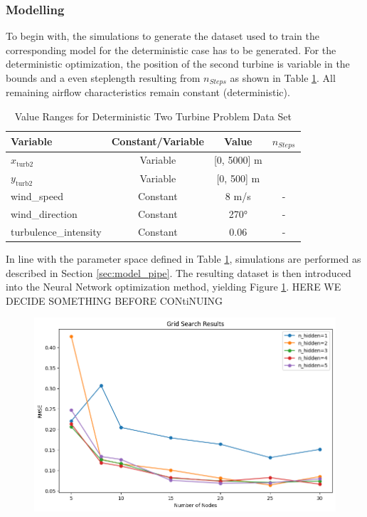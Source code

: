 \subsubsection{Modelling}

To begin with, the simulations to generate the dataset used to train the corresponding model for the deterministic case has to be generated. For the deterministic optimization, the position of the second turbine is variable in the bounds and a even steplength resulting from $n_{Steps}$ as shown in Table \ref{tab:val_determ_data}. All remaining airflow characteristics remain constant (deterministic).

\begin{table}[ht]
	\centering
	\caption{Value Ranges for Deterministic Two Turbine Problem Data Set}
	\begin{tabular}{|l|c|c|c|}
		\hline
		\textbf{Variable} & \textbf{Constant/Variable} & \textbf{Value} & \textbf{$n_{Steps}$}\\
		\hline
		$x_{\text{turb2}}$ & Variable & [0, 5000] m &\\
		$y_{\text{turb2}}$ & Variable & [0, 500] m &\\
		wind\_speed & Constant & 8 m/s & -\\
		wind\_direction & Constant & 270°&- \\
		turbulence\_intensity & Constant & 0.06 & - \\
		\hline
	\end{tabular}

	\label{tab:val_determ_data}
\end{table}

In line with the parameter space defined in Table \ref{tab:val_determ_data}, simulations are performed as described in Section \ref{sec:model_pipe}. The resulting dataset is then introduced into the Neural Network optimization method, yielding Figure \ref{fig:determ_nn_opti}. HERE WE DECIDE SOMETHING BEFORE CONtiNUING

\begin{figure}[h] 
	\centering
	\includegraphics[width=1\textwidth]{figures/optimization/determ_nn_opti.png} 
	\caption{}
	\label{fig:determ_nn_opti}
\end{figure}

